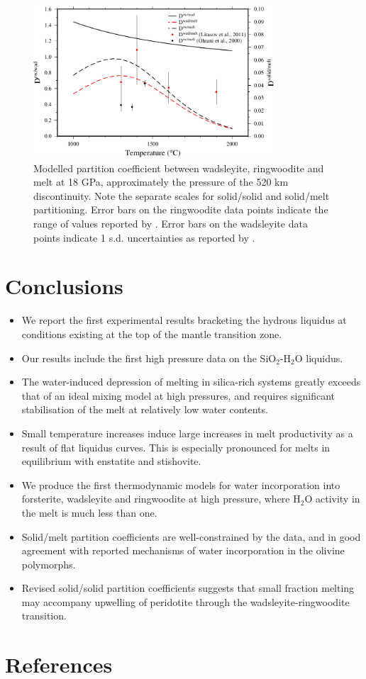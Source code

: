 \documentclass[review]{elsarticle}
\begin{document}
\begin{figure}[ht!]
  \centering
  \includegraphics[width=0.8\textwidth]{figures/rw_wad_partitioning_520}
  \caption{Modelled partition coefficient between wadsleyite, ringwoodite and melt at 18 GPa, approximately the pressure of the 520 km discontinuity. Note the separate scales for solid/solid and solid/melt partitioning. Error bars on the ringwoodite data points indicate the range of values reported by \cite{OMY2000}. Error bars on the wadsleyite data points indicate 1 s.d. uncertainties as reported by \cite{LSOK2011}.}
  \label{fig:partitioning_rw_wad}
\end{figure}

\clearpage
\section{Conclusions}

\begin{itemize}
\item We report the first experimental results bracketing the hydrous liquidus at conditions existing at the top of the mantle transition zone.
\item Our results include the first high pressure data on the SiO$_2$-H$_2$O liquidus.
\item The water-induced depression of melting in silica-rich systems greatly exceeds that of an ideal mixing model at high pressures, and requires significant stabilisation of the melt at relatively low water contents.
\item Small temperature increases induce large increases in melt productivity as a result of flat liquidus curves. This is especially pronounced for melts in equilibrium with enstatite and stishovite.
\item We produce the first thermodynamic models for water incorporation into forsterite, wadsleyite and ringwoodite at high pressure, where H$_2$O activity in the melt is much less than one.
\item Solid/melt partition coefficients are well-constrained by the data, and in good agreement with reported mechanisms of water incorporation in the olivine polymorphs.
\item Revised solid/solid partition coefficients suggests that small fraction melting may accompany upwelling of peridotite through the wadsleyite-ringwoodite transition.
\end{itemize}

\clearpage
\section*{References}


\end{document}

